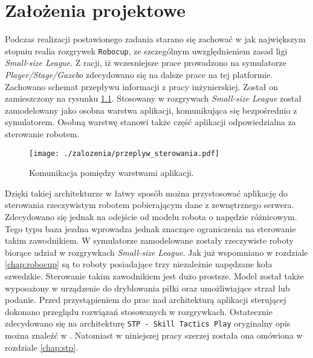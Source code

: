 \chapter{Założenia projektowe \label{chap:zalozenia}}
Podczas realizacji postawionego zadania starano się zachować w jak największym stopniu realia rozgrywek \texttt{Robocup}, ze szczególnym uwzględnieniem zasad ligi \emph{Small-size League}.
Z racji, iż wczesniejsze prace prowadzono na symulatorze \emph{Player/Stage/Gazebo} zdecydowano się na dalsze prace na tej platformie.
Zachowano schemat przepływu informacji z pracy inżynierskiej. Został on zamieszczony na rysunku \ref{fig:przeplyw_sterowania}. Stosowany w rozgrywach \emph{Small-size League} został
zamodelowany jako osobna warstwa  aplikacji, komunikująca się bezpośrednio z symulatorem. Osobną warstwę stanowi także część aplikacji odpowiedzialna za sterowanie robotem.
\begin{figure}[H]
\centering
\texttt{[image: ./zalozenia/przeplyw\_sterowania.pdf]}
\caption{Komunikacja pomiędzy warstwami aplikacji.} \label{fig:przeplyw_sterowania}
\end{figure}
Dzięki takiej architekturze w łatwy sposób można przystosować aplikację do sterowania rzeczywistym robotem pobierającym dane z zewnętrznego serwera.
Zdecydowano się jednak na odejście od modelu robota o napędzie różnicowym. Tego typu baza jezdna wprowadza jednak znaczące ograniczenia na sterowanie takim zawodnikiem. W symulatorze zamodelowane zostały rzeczywiste
roboty biorące udział w rozgrywkach \emph{Small-size League}. Jak już wspomniano w rozdziale \ref{chap:robocup} są to roboty posiadające trzy niezależnie napędzane koła szwedzkie. Sterowanie takim zawodnikiem jest dużo
prostsze. Model został także wyposażony w urządzenie do dryblowania piłki oraz umożliwiające strzał lub podanie.
Przed przystąpieniem do prac nad architekturą aplikacji sterującej dokonano przeglądu rozwiązań stosowanych w rozgrywkach. Ostatecznie zdecydowano się na architekturę 
\mbox{\texttt{STP - Skill Tactics Play}} oryginalny opis można znaleźć w \cite{stp}. Natomiast w niniejszej pracy szerzej została ona omówiona w rozdziale \ref{chap:stp}.
